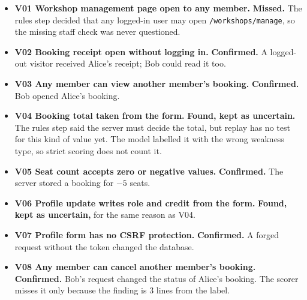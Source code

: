 \documentclass[11pt,a4paper]{article}
\newcommand{\code}[1]{\texttt{#1}}
\newcommand{\st}[2]{\textcolor{#1}{\textbf{#2}}}
\begin{document}
\begin{itemize}[itemsep=3pt]
  \item \textbf{V01 Workshop management page open to any member.} \st{warn}{Missed.} The rules step decided that
        any logged-in user may open \code{/workshops/manage}, so the missing staff check was never questioned.
  \item \textbf{V02 Booking receipt open without logging in.} \st{good}{Confirmed.} A logged-out visitor received
        Alice's receipt; Bob could read it too.
  \item \textbf{V03 Any member can view another member's booking.} \st{good}{Confirmed.} Bob opened Alice's booking.
  \item \textbf{V04 Booking total taken from the form.} \st{accent}{Found, kept as uncertain.} The rules step said
        the server must decide the total, but replay has no test for this kind of value yet. The model labelled it
        with the wrong weakness type, so strict scoring does not count it.
  \item \textbf{V05 Seat count accepts zero or negative values.} \st{good}{Confirmed.} The server stored a booking
        for $-5$ seats.
  \item \textbf{V06 Profile update writes role and credit from the form.} \st{accent}{Found, kept as uncertain,} for
        the same reason as V04.
  \item \textbf{V07 Profile form has no CSRF protection.} \st{good}{Confirmed.} A forged request without the token
        changed the database.
  \item \textbf{V08 Any member can cancel another member's booking.} \st{good}{Confirmed.} Bob's request changed
        the status of Alice's booking. The scorer misses it only because the finding is 3 lines from the label.
\end{itemize}
\end{document}
